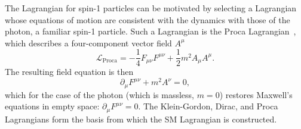 The Lagrangian for spin-1 particles can be motivated by selecting a Lagrangian whose equations of motion are consistent with the dynamics with those of the photon, a familiar spin-1 particle.
Such a Lagrangian is the Proca Lagrangian~\cite{Griffiths:2008zz}, which describes a four-component vector field $A^\mu$
\begin{equation} \label{eqn:proca_lagrangian}
    \mathcal L_{\text{Proca}} = -\frac{1}{4} F_{\mu \nu}F^{\mu \nu} + \frac{1}{2} m^2 A_\mu A^\mu.
\end{equation}
The resulting field equation is then~\cite{Griffiths:2008zz}
\begin{equation}
    \partial_\mu F^{\mu\nu} + m^2A^\nu = 0,
\end{equation}
which for the case of the photon (which is massless, $m=0$) restores Maxwell's equations in empty space: $\partial_\mu F^{\mu\nu} = 0$.
The Klein-Gordon, Dirac, and Proca Lagrangians form the basis from which the SM Lagrangian is constructed.






